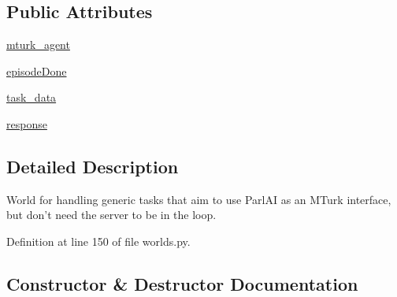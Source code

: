 \subsection*{Public Attributes}
\begin{DoxyCompactItemize}
\item 
\hyperlink{classparlai_1_1mturk_1_1core_1_1legacy__2018_1_1worlds_1_1StaticMTurkTaskWorld_af4bdeb4a05489c01d98ca8251cc2ad97}{mturk\+\_\+agent}
\item 
\hyperlink{classparlai_1_1mturk_1_1core_1_1legacy__2018_1_1worlds_1_1StaticMTurkTaskWorld_a2b173491e6af4ec163df49695ad438b7}{episode\+Done}
\item 
\hyperlink{classparlai_1_1mturk_1_1core_1_1legacy__2018_1_1worlds_1_1StaticMTurkTaskWorld_acc5db69ea637dc47c40833268ce933e9}{task\+\_\+data}
\item 
\hyperlink{classparlai_1_1mturk_1_1core_1_1legacy__2018_1_1worlds_1_1StaticMTurkTaskWorld_ad58aef0c2b48ff7a682082b81d4f25ae}{response}
\end{DoxyCompactItemize}


\subsection{Detailed Description}
\begin{DoxyVerb}World for handling generic tasks that aim to use ParlAI as an MTurk interface, but
don't need the server to be in the loop.
\end{DoxyVerb}
 

Definition at line 150 of file worlds.\+py.



\subsection{Constructor \& Destructor Documentation}
\mbox{\label{classparlai_1_1mturk_1_1core_1_1legacy__2018_1_1worlds_1_1StaticMTurkTaskWorld_afca35f07eb86bac34180c21cca0741c2}} 
